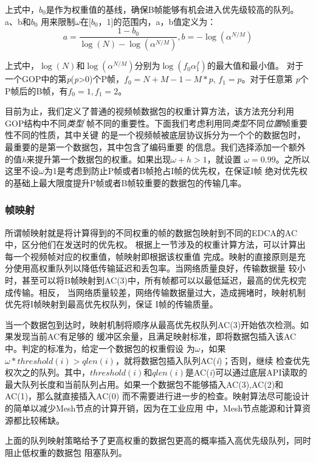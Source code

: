 上式中，$b_{0}$是作为权重值的基线，确保B帧能够有机会进入优先级较高的队列。a、b和$b_{0}$
用来限制$\omega$在[$b_{0}$，1]的范围内，a，b值定义为：
\begin{equation}
a = \frac{1-b_{0}}{\log(N) - \log(\alpha^{N/M})},
b = -\log(\alpha^{N/M})
\end{equation}

上式中，$\log(N)$和$\log(\alpha^{N/M})$分别为$\log(f_{0}\alpha^f_{1})$的最大值和最小值。
对于一个GOP中的第\emph{p}(\emph{p}>0)个P帧，$f_{0}=N+M-1-M*p$, $f_{1}=p$。对于任意第
\emph{p}个P帧后的B帧，有$f_{0}=1, f_{1}=2$。

目前为止，我们定义了普通的视频帧数据包的权重计算方法，该方法充分利用GOP结构中不同\emph{类型}
帧不同的重要性。下面我们考虑利用同\emph{类型}不同\emph{位置}帧重要性不同的性质，其中关键
的是一个视频帧被底层协议拆分为一个个的数据包时，最重要的是第一个数据包，其中包含了编码重要
的信息。我们选择添加一个额外的值\emph{h}来提升第一个数据包的权重。如果出现$\omega+h>1$，就设置
$\omega=0.99$。之所以这里不设$\omega$为1是考虑到防止P帧或者B帧抢占I帧的优先权，在保证I帧
绝对优先权的基础上最大限度提升P帧或者B帧较重要的数据包的传输几率。

\subsubsection{帧映射}
所谓帧映射就是将计算得到的不同权重的帧的数据包映射到不同的EDCA的AC中，区分他们在发送时的优先权。
根据上一节涉及的权重计算方法，可以计算出每一个视频帧对应的权重值，帧映射即根据该权重值
完成。映射的直接原则是充分使用高权重队列以降低传输延迟和丢包率。当网络质量良好，传输数据量
较小时，甚至可以将B帧映射到AC(3)中，所有帧都可以以最低延迟，最高的优先权完成传输。相反，
当网络质量较差，网络传输数据量过大，造成拥堵时，映射机制优先将I帧映射到最高优先权队列，保证
I帧的传输质量。

当一个数据包到达时，映射机制将顺序从最高优先权队列AC(3)开始依次检测。如果发现当前AC有足够的
缓冲区余量，且满足映射标准，即将数据包插入该AC中。判定的标准为，给定一个数据包的权重假设
为$\omega$，如果$\omega*threshold(i)>qlen(i)$，就将数据包插入队列AC(\emph{i})；否则，继续
检查优先权次之的队列。其中，$threshold(i)$和$qlen(i)$是AC(\emph{i})可以通过底层API读取的
最大队列长度和当前队列占用。如果一个数据包不能够插入AC(3),AC(2)和AC(1)，那么就直接插入AC(0)
而不需要进行进一步的检查。映射算法尽可能设计的简单以减少Mesh节点的计算开销，因为在工业应用
中，Mesh节点能源和计算资源都比较稀缺。

上面的队列映射策略给予了更高权重的数据包更高的概率插入高优先级队列，同时阻止低权重的数据包
阻塞队列。

